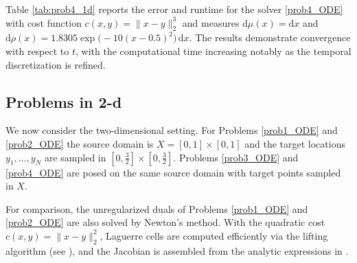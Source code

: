 \documentclass{scrartcl}
\newcommand{\dd}{\mathrm d}
\theoremstyle{plain}
\theoremstyle{definition}
\begin{document}
Table \ref{tab:prob4_1d} reports the error and runtime for the solver \eqref{prob4_ODE} with cost function \(c(x,y)=\|x-y\|_2^3\) and measures \(\mathrm{d}\mu(x)=\mathrm{d}x\) and \(\mathrm{d}\rho(x)=1.8305 \exp\big(-10(x-0.5)^2\big)\,\mathrm{d}x\). The results demonstrate convergence with respect to $t$, with the computational time increasing notably as the temporal discretization is refined.

\begin{table}[ht]
    \centering{}
    \caption{Error and time for \eqref{prob4_ODE} with $\dd\mu(x) = \dd x$ and $\dd\rho(x) = 1.8305e^{-10(x-0.5)^2}\dd x$}\label{tab:prob4_1d}
\end{table}

\subsection{Problems in 2-d}

We now consider the two-dimensional setting. For Problems \eqref{prob1_ODE} and \eqref{prob2_ODE} the source domain is \(X=[0,1]\times[0,1]\) and the target locations \(y_1,\dots,y_N\) are sampled in $\left[0,\tfrac{3}{2}\right]\times\left[0,\tfrac{3}{2}\right]$. Problems \eqref{prob3_ODE} and \eqref{prob4_ODE} are posed on the same source domain with target points sampled in \(X\). 

For comparison, the unregularized duals of Problems \eqref{prob1_ODE} and \eqref{prob2_ODE} are also solved by Newton's method. With the quadratic cost \(c(x,y)=\|x-y\|_2^2\), Laguerre cells are computed efficiently via the lifting algorithm (see \cite{levy2015numerical}), and the Jacobian is assembled from the analytic expressions in \cite{kitagawa2019convergence,de2019differentiation}. 
\end{document}
